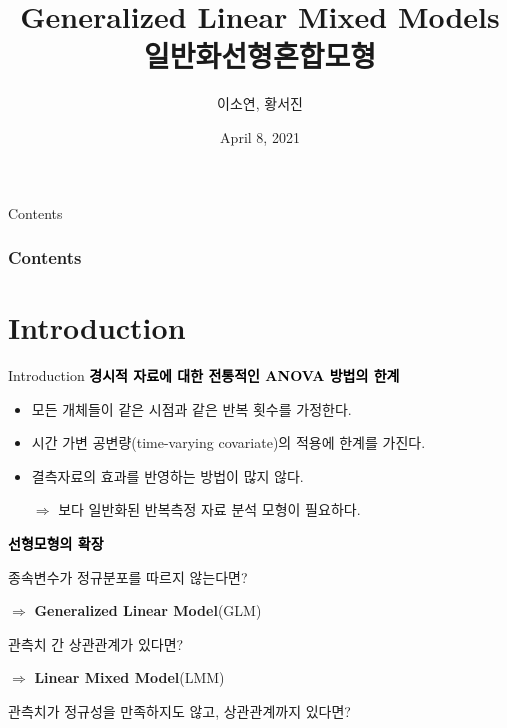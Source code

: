 \documentclass[9pt, xelatex]{beamer}
\title[Short title]{Generalized Linear Mixed Models \\ 일반화선형혼합모형} %
\author{이소연, 황서진} %
\institute[] %
{
	고려대학교 통계학과 %
\medskip
}
\date{April 8, 2021} %
\begin{document}
\begin{frame}
\titlepage %
\end{frame}

\begin{frame}{Contents}
\frametitle{Contents}
\tableofcontents 
\end{frame}



\section{Introduction}{
	\begin{frame}[allowframebreaks]{Introduction}
	\textcolor{black}{\textbf{경시적 자료에 대한 전통적인 ANOVA 방법의 한계}}
		\vspace{5mm}
		
	\begin{itemize}
		\item 모든 개체들이 같은 시점과 같은 반복 횟수를 가정한다.
		\item 시간 가변 공변량(time-varying covariate)의 적용에 한계를 가진다.
		\item 결측자료의 효과를 반영하는 방법이 많지 않다.
		\vspace{5mm}
		
		$\Longrightarrow$ 보다 일반화된 반복측정 자료 분석 모형이 필요하다.
	\end{itemize}
	
		\pagebreak
	\textcolor{black}{\textbf{선형모형의 확장}}
	\vspace{5mm}
	
	종속변수가 정규분포를 따르지 않는다면?
	\vspace{2mm}
	
	$\Longrightarrow$ \textbf{Generalized Linear Model}(GLM)
	\vspace{5mm}
	
	관측치 간 상관관계가 있다면?
	\vspace{2mm}
	
	$\Longrightarrow$ \textbf{Linear Mixed Model}(LMM)
	\vspace{5mm}
	
	관측치가 정규성을 만족하지도 않고, 상관관계까지 있다면?
	\vspace{2mm}


\end{frame}}
\end{document}
